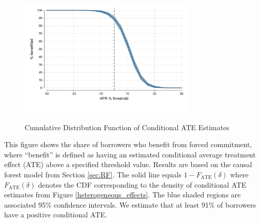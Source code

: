 \documentclass[oneside,11pt]{article}
\begin{document}
\cleardoublepage

\begin{figure}[H]
    \centering
  \caption{Cumulative Distribution Function of Conditional ATE Estimates}
  \includegraphics[width=0.75\textwidth]{Figuras/cdf_CATE.pdf} 
    \label{fig:CATEsurvival}
\end{figure}
 
This figure shows the share of borrowers who benefit from forced commitment, where ``benefit'' is defined as having an estimated conditional average treatment effect (ATE) above a specified threshold value. Results are based on the causal forest model from Section \ref{sec:RF}. The solid line equals $1 - F_\text{ATE}(\delta)$ where $F_\text{ATE}(\delta)$ denotes the CDF corresponding to the density of conditional ATE estimates from Figure \ref{heterogeneous_effects}. The blue shaded regions are associated 95\% confidence intervals. We estimate that at least 91\% of borrowers have a positive conditional ATE. 

  
\cleardoublepage
\end{document}
